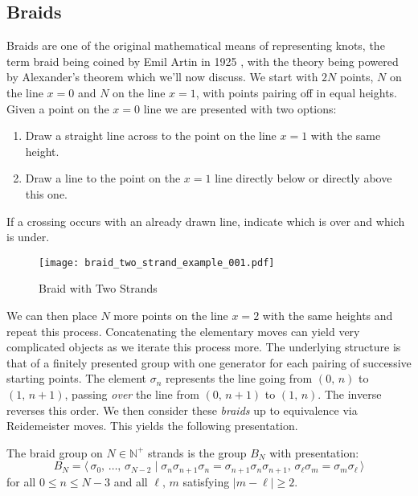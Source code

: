     \subsection{Braids}
        Braids are one of the original mathematical means of representing knots,
        the term braid being coined by Emil Artin in 1925
        \cite{ArtinBraidTheory1925}, with the theory being powered by
        Alexander's theorem which we'll now discuss. We start with $2N$
        points, $N$ on the line $x=0$ and $N$ on the line $x=1$, with points
        pairing off in equal heights. Given a point on the $x=0$ line we are
        presented with two options:
        \begin{enumerate}
            \item Draw a straight line across to the point on the line $x=1$
                with the same height.
            \item
            Draw a line to the point on the $x=1$ line directly below or
            directly above this one.
        \end{enumerate}
        If a crossing occurs with an already drawn line,
        indicate which is over and which is under.
        \begin{figure}
            \centering
            \texttt{[image: braid\_two\_strand\_example\_001.pdf]}
            \caption{Braid with Two Strands}
            \label{fig:braid_two_strand_example_001}
        \end{figure}
        We can then place $N$ more points on the line $x=2$ with the same
        heights and repeat this process. Concatenating the elementary moves
        can yield very complicated objects as we iterate this process more.
        The underlying structure is that of a finitely presented group with
        one generator for each pairing of successive starting points.
        The element $\sigma_{n}$ represents the line going from
        $(0,\,n)$ to $(1,\,n+1)$, passing \textit{over} the line from
        $(0,\,n+1)$ to $(1,\,n)$.
        The inverse reverses this order. We then consider these \textit{braids}
        up to equivalence via Reidemeister moves. This yields the following
        presentation.
        \begin{definition}
            The braid group on $N\in\mathbb{N}^{+}$ strands is the group
            $B_{N}$ with presentation:
            \begin{equation}
                B_{N}=\langle\,
                    \sigma_{0},\,\dots,\,\sigma_{N-2}\;|\;
                    \sigma_{n}\sigma_{n+1}\sigma_{n}
                    =\sigma_{n+1}\sigma_{n}\sigma_{n+1},\,
                    \sigma_{\ell}\sigma_{m}=\sigma_{m}\sigma_{\ell}\,
                \rangle
            \end{equation}
            for all $0\leq{n}\leq{N-3}$ and all $\ell,\,m$ satisfying
            $|m-\ell|\geq{2}$.
        \end{definition}
